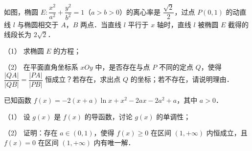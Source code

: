 \begin{question}
如图，椭圆 \(E:\dfrac{x^2}{a^2}+\dfrac{y^2}{b^2}=1\)（\(a>b>0\)）的离心率是 \(\dfrac{\sqrt{2}}{2}\)，过点 \(P(0,1)\) 的动直线 \(l\) 与椭圆相交于 \(A\)，\(B\) 两点．当直线 \(l\) 平行于 \(x\) 轴时，直线 \(l\) 被椭圆 \(E\) 截得的线段长为 \(2\sqrt{2}\)．
\nopagebreak[4]
\begin{center}\end{center}
\nopagebreak[4]
（1） 求椭圆 \(E\) 的方程；

（2） 在平面直角坐标系 \(xOy\) 中，是否存在与点 \(P\) 不同的定点 \(Q\)，使得 \(\dfrac{|QA|}{|QB|}=\dfrac{|PA|}{|PB|}\) 恒成立？若存在，求出点 \(Q\) 的坐标；若不存在，请说明理由．

\end{question}
\begin{question}
已知函数 \(f(x)=-2(x+a)\ln x+x^2-2ax-2a^2+a\)，其中 \(a>0\)．

（1） 设 \(g(x)\) 是 \(f(x)\) 的导函数，讨论 \(g(x)\) 的单调性；

（2） 证明：存在 \(a\in(0,1)\)，使得 \(f(x)\geqslant 0\) 在区间 \((1,+\infty)\) 内恒成立，且 \(f(x)=0\) 在区间 \((1,+\infty)\) 内有唯一解．

\end{question}